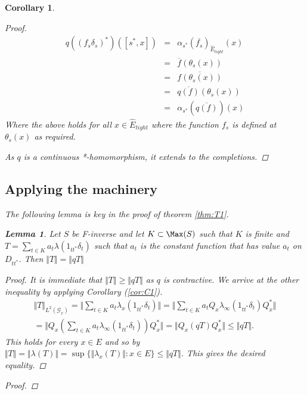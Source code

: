 \documentclass[11pt]{amsart}
\theoremstyle{plain}
\newtheorem{lemma}[theorem]{Lemma}%
\newtheorem{corollary}[theorem]{Corollary}%
\theoremstyle{definition}%
\theoremstyle{remark}%
\newcommand{\E}{\widehat{E}}
\begin{document}
\begin{corollary}
\begin{proof}
\begin{eqnarray*}
q((f_{s}\delta_{s})^{*})([s^{*},x])& = &\alpha_{s^{*}}(\overline{f_{s}})_{\E_{tight}}(x)\\
& = & \overline{f}(\theta_{s}(x)) \\ & = & \overline{f(\theta_{s}(x))} \\ & = & \overline{q(f)}(\theta_{s}(x)) \\ & = &  \alpha_{s^{*}}(\overline{q(f)})(x)
\end{eqnarray*}
Where the above holds for all $x \in \E_{tight}$ where the function $f_{s}$ is defined at $\theta_{s}(x)$ as required.

As $q$ is a continuous *-homomorphism, it extends to the completions.
\end{proof}

\subsection{Applying the machinery}
The following lemma is key in the proof of theorem \ref{thm:T1}.
\begin{lemma}\label{lem:L3}
Let $S$ be F-inverse and let $K \subset \Max(S)$ such that $K$ is finite and $T=\sum_{t \in K} a_{t}\lambda(1_{tt^{*}}\delta_{t})$ such that $a_{t}$ is the constant function that has value $a_{t}$ on $D_{tt^{*}}$. Then $\Vert T \Vert = \Vert qT \Vert$
\end{lemma}
\begin{proof}
It is immediate that $\Vert T \Vert \geq \Vert qT \Vert$ as $q$ is contractive. We arrive at the other inequality by applying Corollary (\ref{cor:C1}).
\begin{eqnarray*}
\Vert T \Vert_{L^{2}(\mathcal{G}_{x})} = \Vert \sum_{t \in K} a_{t}\lambda_{x}(1_{tt^{*}}\delta_{t}) \Vert = \Vert \sum_{t \in K} a_{t}Q_{x}\lambda_{\infty}(1_{tt^{*}}\delta_{t})Q_{x}^{*} \Vert \\
= \Vert Q_{x}(\sum_{t \in K} a_{t}\lambda_{\infty}(1_{tt^{*}}\delta_{t}))Q_{x}^{*} \Vert = \Vert Q_{x}(qT)Q_{x}^{*} \Vert \leq \Vert qT \Vert.
\end{eqnarray*}
This holds for every $x \in E$ and so by  $\Vert T \Vert = \Vert \lambda(T) \Vert = \sup \lbrace \Vert \lambda_{x}(T) \Vert : x \in E \rbrace \leq \Vert qT \Vert$. This gives the desired equality.  
\end{proof}

\begin{proof}


\end{proof}
\end{corollary}
\end{document}
